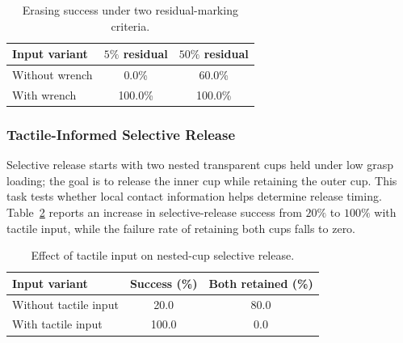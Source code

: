 \begin{table}[t]
    \centering
    \caption{Erasing success under two residual-marking criteria.}
    \label{tab:erasing_results}
    \small
    \begin{tabular}{lcc}
        \toprule
        Input variant & $5\%$ residual & $50\%$ residual\\
        \midrule
        Without wrench & 0.0\% & 60.0\%\\
        With wrench & 100.0\% & 100.0\%\\
        \bottomrule
    \end{tabular}
\end{table}

\subsubsection{Tactile-Informed Selective Release}

Selective release starts with two nested transparent cups held under low grasp loading; the goal is to release the inner cup while retaining the outer cup.
This task tests whether local contact information helps determine release timing.
Table~\ref{tab:release_results} reports an increase in selective-release success from $20\%$ to $100\%$ with tactile input, while the failure rate of retaining both cups falls to zero.

\begin{table}[t]
    \centering
    \caption{Effect of tactile input on nested-cup selective release.}
    \label{tab:release_results}
    \small
    \begin{tabular}{lcc}
        \toprule
        Input variant & Success (\%) & Both retained (\%)\\
        \midrule
        Without tactile input & 20.0 & 80.0\\
        With tactile input & 100.0 & 0.0\\
        \bottomrule
    \end{tabular}
\end{table}

